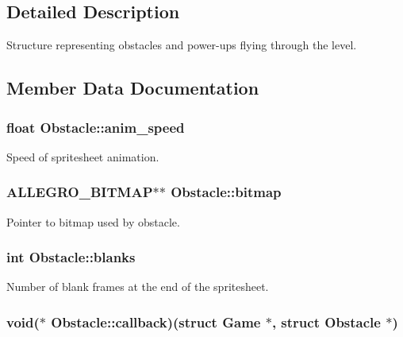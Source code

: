 \subsection{\-Detailed \-Description}
\-Structure representing obstacles and power-\/ups flying through the level. 

\subsection{\-Member \-Data \-Documentation}
\hypertarget{structObstacle_a96a13e4704e4643291989193a112366a}{
\subsubsection[{anim\-\_\-speed}]{\setlength{\rightskip}{0pt plus 5cm}float {\bf \-Obstacle\-::anim\-\_\-speed}}}\label{structObstacle_a96a13e4704e4643291989193a112366a}
\-Speed of spritesheet animation. \hypertarget{structObstacle_a1f35f88fe8f6d0664da082f82ae4b774}{
\subsubsection[{bitmap}]{\setlength{\rightskip}{0pt plus 5cm}\-A\-L\-L\-E\-G\-R\-O\-\_\-\-B\-I\-T\-M\-A\-P$\ast$$\ast$ {\bf \-Obstacle\-::bitmap}}}\label{structObstacle_a1f35f88fe8f6d0664da082f82ae4b774}
\-Pointer to bitmap used by obstacle. \hypertarget{structObstacle_a862f4038bd63057d91406720bb586a9c}{
\subsubsection[{blanks}]{\setlength{\rightskip}{0pt plus 5cm}int {\bf \-Obstacle\-::blanks}}}\label{structObstacle_a862f4038bd63057d91406720bb586a9c}
\-Number of blank frames at the end of the spritesheet. \hypertarget{structObstacle_a21b4ff0edaa2dc5394ff7a6328e48358}{
\subsubsection[{callback}]{\setlength{\rightskip}{0pt plus 5cm}void($\ast$ {\bf \-Obstacle\-::callback})(struct {\bf \-Game} $\ast$, struct {\bf \-Obstacle} $\ast$)}}\label{structObstacle_a21b4ff0edaa2dc5394ff7a6328e48358}
